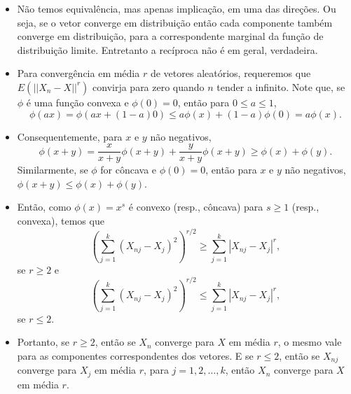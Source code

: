 \begin{frame}
\begin{block}{}
	\begin{itemize}


\item Não temos equivalência, mas apenas
implicação, em uma das direções. Ou seja, se o vetor converge em
distribuição então cada componente também converge em distribuição,
para a correspondente marginal da função de distribuição limite.
Entretanto a recíproca não é em geral, verdadeira.

\item Para convergência em média $r$ de vetores aleatórios, requeremos
que $E(||X_n-X||^r)$ convirja para zero quando $n$ tender a infinito. Note que, se $\phi$ é uma função convexa e $\phi(0)=0$, então para $0\leq a\leq 1$,
$$\phi(ax)=\phi(ax+(1-a)0)\leq a\phi(x)+(1-a)\phi(0)=a\phi(x).$$ 

\item Consequentemente, para $x$ e $y$ não negativos,
$$\phi(x+y)=\frac{x}{x+y}\phi(x+y)+\frac{y}{x+y}\phi(x+y)\geq \phi(x)+\phi(y).$$
Similarmente, se $\phi$ for côncava e $\phi(0)=0$, então para $x$ e $y$ não negativos, $\phi(x+y)\leq \phi(x)+\phi(y)$.
%
%
%
%

\end{itemize}
\end{block}
\end{frame}
%
\begin{frame}
\begin{block}{}
%
\begin{itemize}
\item Então, como $\phi(x)=x^s$ é convexo (resp., côncava) para $s\geq 1$ (resp., convexa), temos que 
$$(\sum_{j=1}^{k}(X_{nj}-X_j)^2)^{r/2}\geq \sum_{j=1}^{k}|X_{nj}-X_j|^r,$$
se $r\geq 2$ e
$$(\sum_{j=1}^{k}(X_{nj}-X_j)^2)^{r/2}\leq \sum_{j=1}^{k}|X_{nj}-X_j|^r,$$
se $r\leq 2$.

\item Portanto, se $r\geq 2$, então se $X_n$ converge para $X$ em média $r$, o mesmo vale para as componentes correspondentes dos vetores. E se $r\leq 2$, então
se $X_{nj}$ converge para $X_j$ em média $r$, para $j=1,2,\ldots,k$, então $X_n$ converge para $X$ em média $r$.  
\end{itemize}
\end{block}
\end{frame}



